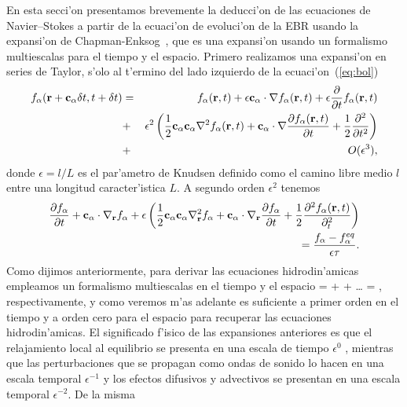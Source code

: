 En esta secci'on presentamos brevemente la deducci'on de  las ecuaciones de Navier--Stokes a partir de la ecuaci'on
de evoluci'on de la EBR usando la expansi'on de Chapman-Enksog~\cite{guo00}, que es 
una expansi'on usando un formalismo multiescalas para el tiempo y el espacio. 
Primero realizamos una expansi'on en series de Taylor, s'olo al t'ermino del lado izquierdo
de la ecuaci'on~(\ref{eq:bol})
\begin{eqnarray}
\label{eq:expansion}
\nonumber
f_\alpha (\textbf r + \textbf c_\alpha \delta t, t + \delta t) &=& 
f_\alpha (\textbf r,t) + \epsilon \textbf c_\alpha \cdot \nabla f_\alpha(\textbf r,t) 
+ \epsilon \frac{\partial }{\partial t} f_\alpha (\textbf r,t)  \\
\nonumber
&+& \epsilon^2 \left( \frac{1}{2} \textbf c_\alpha \textbf c_\alpha \nabla^2 f_\alpha (\textbf r,t) 
+ \textbf c_\alpha \cdot \nabla \frac{\partial f_\alpha(\textbf r,t)}{\partial t} + \frac{1}{2} \frac{\partial^2}{\partial t^2} \right)\\
&+& O(\epsilon^3),
\end{eqnarray}
donde $\epsilon=l/L$ es el par'ametro de Knudsen definido como el camino libre medio $l$ entre una 
longitud caracter'istica $L$. A segundo orden $\epsilon^2$ tenemos
\begin{eqnarray}
\label{eq:2-28}
\nonumber
\frac{\partial f_\alpha}{\partial t} + \textbf c_\alpha \cdot \nabla_\textbf r f_\alpha 
+\epsilon \left( \frac{1}{2}\textbf c_\alpha \textbf c_\alpha \nabla^2_\textbf r f_\alpha
+ \textbf c_\alpha \cdot \nabla_\textbf r \frac{\partial f_\alpha}{\partial t} 
+ \frac{1}{2} \frac{\partial^2 f_\alpha(\textbf r,t)}{\partial_t^2}\right)  \\
=\frac{f_\alpha-f_\alpha^{eq}}{\epsilon \tau}.
\end{eqnarray}
Como dijimos anteriormente, para derivar las ecuaciones hidrodin'amicas empleamos un formalismo multiescalas
en el tiempo y el espacio
\BE
\label{eq:formalismo}
 =  + \epsilon {} + \ldots
{} \qquad
\frac{\partial}{\partial \vr} = ,
\EE
respectivamente, y como veremos  m'as adelante es suficiente a primer orden en el tiempo y a orden cero para 
el espacio para recuperar las ecuaciones hidrodin'amicas. El significado f'isico
de las expansiones anteriores es que el relajamiento local al equilibrio se presenta 
en una escala de tiempo $\epsilon^0$ , mientras que las perturbaciones que se propagan como 
ondas de sonido lo hacen en una escala temporal $\epsilon^{-1}$ 
y los efectos difusivos y  advectivos se presentan en una escala temporal $\epsilon^{-2}$. De la misma
